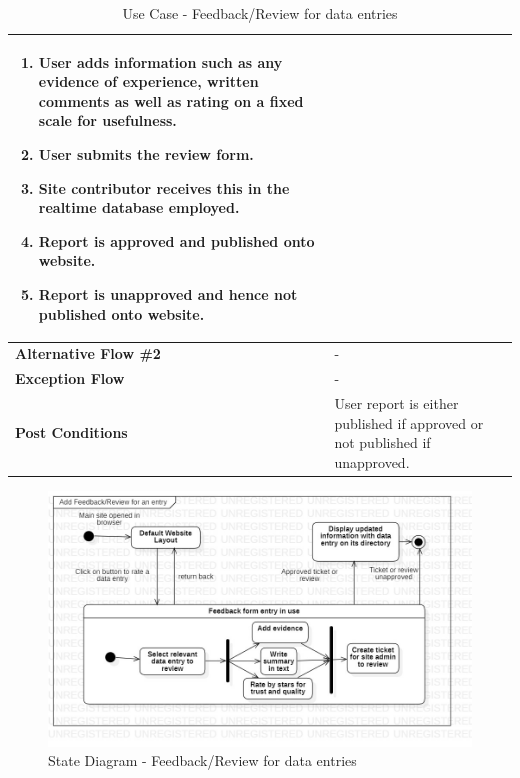 \begin{table}[H]
{\begin{tabular}{|p{.3\linewidth}|p{.7\linewidth}|}
\begin{minipage}[H]{\linewidth}
\begin{enumerate}[label=\textbf{Step \arabic*:},leftmargin=1.5\leftmargin]
            \item User adds information such as any evidence of experience, written comments as well as rating on a fixed scale for usefulness.
            \item User submits the review form.
            \item Site contributor receives this in the realtime database employed.
            \item Report is approved and published onto website.
            \item Report is unapproved and hence not published onto website.
          \end{enumerate}
        \end{minipage} \\
      \hline
      \textbf{Alternative Flow \#2} & - \\
      \hline
      \textbf{Exception Flow} & - \\
      \hline
      \textbf{Post Conditions} & User report is either published if approved or not published if unapproved. \\
      \hline
    \end{tabular}
  }
  \caption{Use Case - Feedback/Review for data entries}
\end{table}

\begin{figure}[H]
  \centering
  \includegraphics[width=\linewidth]{img/state-diagram-s4-feedback-review.jpg}
  \caption{State Diagram - Feedback/Review for data entries}
\end{figure}

